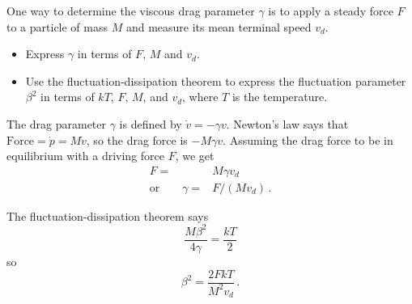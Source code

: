 

One way to determine the viscous drag parameter $\gamma$ is to apply a steady force $F$ to a particle of mass $M$ and measure its mean terminal speed $v_d$.

\begin{itemize}
  \item Express $\gamma$ in terms of $F$, $M$ and $v_d$.
  \item Use the fluctuation-dissipation theorem to express the fluctuation parameter $\beta^2$ in terms of $kT$, $F$, $M$, and $v_d$, where $T$ is the temperature.
\end{itemize}


The drag parameter $\gamma$ is defined by $\dot{v} = - \gamma v$.
Newton's law says that $\text{Force} = \dot{p} = M \dot{v}$, so the drag force is $- M \gamma v$.
Assuming the drag force to be in equilibrium with a driving force $F$, we get
\begin{align}
  F =& M \gamma v_d \\
  \text{or} \qquad \gamma =& F / (M v_d) \, .
\end{align}

The fluctuation-dissipation theorem says
\begin{displaymath}
  \frac{M \beta^2}{4 \gamma} = \frac{kT}{2}
\end{displaymath}
so
\begin{displaymath}
  \beta^2 = \frac{2 F k T}{M^2 v_d} \, .
\end{displaymath}
